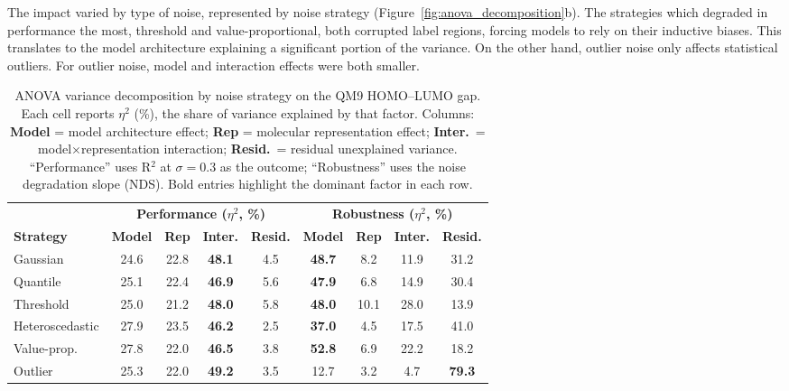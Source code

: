 The impact varied by type of noise, represented by noise strategy (Figure~\ref{fig:anova_decomposition}b). The strategies which degraded in performance the most, threshold and value-proportional, both corrupted label regions, forcing models to rely on their inductive biases. This translates to the model architecture explaining a significant portion of the variance. On the other hand, outlier noise only affects statistical outliers. For outlier noise, model and interaction effects were both smaller.

\begin{table}[htbp]
\centering
\caption[ANOVA variance decomposition by noise strategy on QM9.]{ANOVA variance decomposition by noise strategy on the QM9 HOMO--LUMO gap. Each cell reports $\eta^2$ (\%), the share of variance explained by that factor. Columns: \textbf{Model} = model architecture effect; \textbf{Rep} = molecular representation effect; \textbf{Inter.}\ = model$\times$representation interaction; \textbf{Resid.}\ = residual unexplained variance. ``Performance'' uses R$^2$ at $\sigma = 0.3$ as the outcome; ``Robustness'' uses the noise degradation slope (NDS). Bold entries highlight the dominant factor in each row.}
\label{tab:anova_decomposition}
\small
\begin{adjustbox}{max width=\textwidth}
\begin{tabular}{lcccccccc}
\toprule
& \multicolumn{4}{c}{\textbf{Performance ($\eta^2$, \%)}} & \multicolumn{4}{c}{\textbf{Robustness ($\eta^2$, \%)}} \\
\cmidrule(lr){2-5} \cmidrule(lr){6-9}
\textbf{Strategy} & \textbf{Model} & \textbf{Rep} & \textbf{Inter.} & \textbf{Resid.} & \textbf{Model} & \textbf{Rep} & \textbf{Inter.} & \textbf{Resid.} \\
\midrule
Gaussian        & 24.6 & 22.8 & \textbf{48.1} &  4.5 & \textbf{48.7} &  8.2 & 11.9 & 31.2 \\
Quantile        & 25.1 & 22.4 & \textbf{46.9} &  5.6 & \textbf{47.9} &  6.8 & 14.9 & 30.4 \\
Threshold       & 25.0 & 21.2 & \textbf{48.0} &  5.8 & \textbf{48.0} & 10.1 & 28.0 & 13.9 \\
Heteroscedastic & 27.9 & 23.5 & \textbf{46.2} &  2.5 & \textbf{37.0} &  4.5 & 17.5 & 41.0 \\
Value-prop.     & 27.8 & 22.0 & \textbf{46.5} &  3.8 & \textbf{52.8} &  6.9 & 22.2 & 18.2 \\
Outlier         & 25.3 & 22.0 & \textbf{49.2} &  3.5 & 12.7 &  3.2 &  4.7 & \textbf{79.3} \\
\bottomrule
\end{tabular}
\end{adjustbox}
\end{table}

